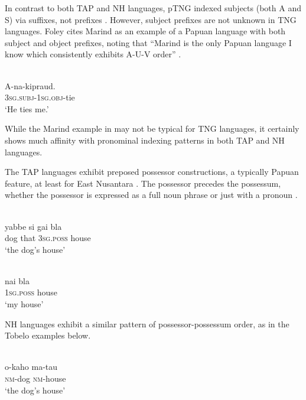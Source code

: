 In contrast to both TAP and NH languages, pTNG indexed subjects (both A and S) via suffixes, not prefixes \citep{Foley2000}. However, subject prefixes are not unknown in TNG languages. Foley cites Marind as an example of a Papuan language with both subject and object prefixes, noting that ``Marind is the only Papuan language I know which consistently exhibits A-U-V order'' \citeyearpar[138]{Foley1986}.

\ea%
\label{ex:4:12}
 \\
\gll  A-na-kipraud. \\
   3\textsc{sg.subj-1sg.obj-}tie \\
\glt `He ties me.'
\z





While the Marind example in  may not be typical for TNG languages, it certainly shows much affinity with pronominal indexing patterns in both TAP and NH languages.

The TAP languages exhibit preposed possessor constructions, a typically Papuan feature, at least for East Nusantara \citep{KlamerEtAl2008}. The possessor precedes the possessum, whether the possessor is expressed as a full noun phrase  or just with a pronoun .


\ea%
\label{ex:4:13}
 \\
\gll  yabbe si gai bla \\
   dog that \textsc{3sg.poss} house \\
\glt `the dog's house'
\z





\ea%
\label{ex:4:14}
 \\
\gll  nai bla \\
  \textsc{1sg.poss} house \\
\glt `my house'
\z





NH languages exhibit a similar pattern of possessor-possessum order, as in the Tobelo examples below.

\ea%
\label{ex:4:15}
 \\
\gll  o-kaho ma-tau \\
   \textsc{nm}-dog \textsc{nm}-house\\
\glt `the dog's house'
\z





